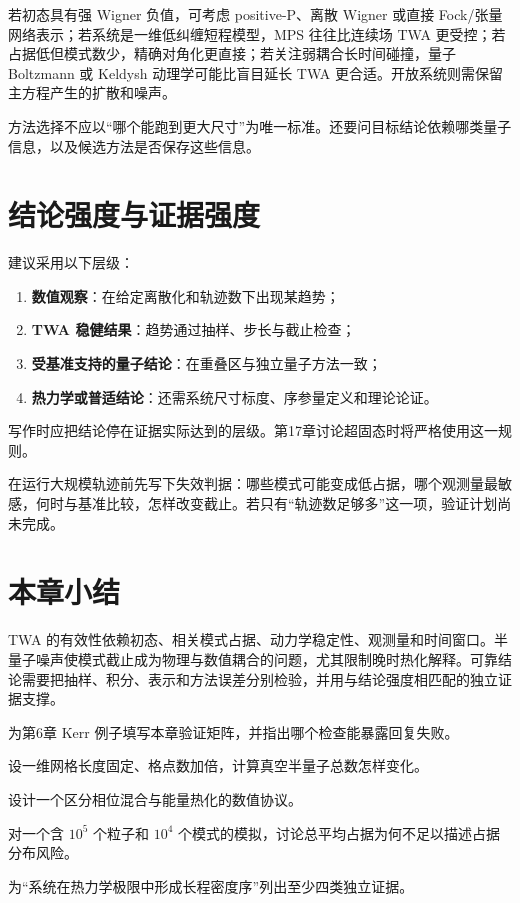 若初态具有强 Wigner 负值，可考虑 positive-P、离散 Wigner 或直接 Fock/张量网络表示；若系统是一维低纠缠短程模型，MPS 往往比连续场 TWA 更受控；若占据低但模式数少，精确对角化更直接；若关注弱耦合长时间碰撞，量子 Boltzmann 或 Keldysh 动理学可能比盲目延长 TWA 更合适。开放系统则需保留主方程产生的扩散和噪声。

方法选择不应以“哪个能跑到更大尺寸”为唯一标准。还要问目标结论依赖哪类量子信息，以及候选方法是否保存这些信息。

\section{结论强度与证据强度}

建议采用以下层级：
\begin{enumerate}
  \item \textbf{数值观察}：在给定离散化和轨迹数下出现某趋势；
  \item \textbf{TWA 稳健结果}：趋势通过抽样、步长与截止检查；
  \item \textbf{受基准支持的量子结论}：在重叠区与独立量子方法一致；
  \item \textbf{热力学或普适结论}：还需系统尺寸标度、序参量定义和理论论证。
\end{enumerate}
写作时应把结论停在证据实际达到的层级。第17章讨论超固态时将严格使用这一规则。

\begin{chaptercheck}
在运行大规模轨迹前先写下失效判据：哪些模式可能变成低占据，哪个观测量最敏感，何时与基准比较，怎样改变截止。若只有“轨迹数足够多”这一项，验证计划尚未完成。
\end{chaptercheck}

\section*{本章小结}

TWA 的有效性依赖初态、相关模式占据、动力学稳定性、观测量和时间窗口。半量子噪声使模式截止成为物理与数值耦合的问题，尤其限制晚时热化解释。可靠结论需要把抽样、积分、表示和方法误差分别检验，并用与结论强度相匹配的独立证据支撑。

\begin{exercises}
  \item 为第6章 Kerr 例子填写本章验证矩阵，并指出哪个检查能暴露回复失败。
  \item 设一维网格长度固定、格点数加倍，计算真空半量子总数怎样变化。
  \item 设计一个区分相位混合与能量热化的数值协议。
  \item 对一个含 $10^5$ 个粒子和 $10^4$ 个模式的模拟，讨论总平均占据为何不足以描述占据分布风险。
  \item 为“系统在热力学极限中形成长程密度序”列出至少四类独立证据。
\end{exercises}
